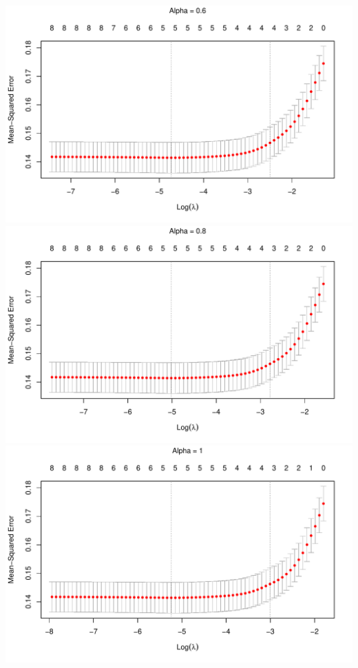 \documentclass[
]{article}
\begin{document}
\includegraphics[width=\textwidth]{A2_files/figure-latex/unnamed-chunk-7-4}
\includegraphics[width=\textwidth]{A2_files/figure-latex/unnamed-chunk-7-5}
\includegraphics[width=\textwidth]{A2_files/figure-latex/unnamed-chunk-7-6}
\end{document}

